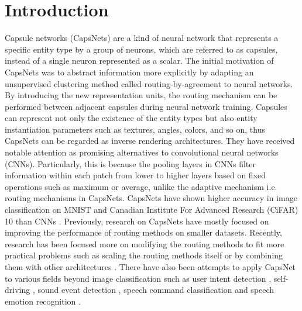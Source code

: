 \documentclass[review]{elsarticle}
\begin{document}
\linenumbers

\section{Introduction}
Capsule networks (CapsNets) \citep{DBLP:conf/icann/HintonKW11, DBLP:conf/nips/SabourFH17, DBLP:conf/iclr/HintonSF18} are a kind of neural network that represents a specific entity type by a group of neurons, which are referred to as capsules, instead of a single neuron represented as a scalar.
The initial motivation of CapsNets was to abstract information more explicitly by adapting an unsupervised clustering method called routing-by-agreement to neural networks.
By introducing the new representation units, the routing mechanism can be performed between adjacent capsules during neural network training.
Capsules can represent not only the existence of the entity types but also entity instantiation parameters such as textures, angles, colors, and so on, thus CapsNets can be regarded as inverse rendering architectures.
They have received notable attention as promising alternatives to convolutional neural networks (CNNs).
Particularly, this is because the pooling layers in CNNs filter information within each patch from lower to higher layers based on fixed operations such as maximum or average, unlike the adaptive mechanism i.e. routing mechanisms in CapsNets.
CapsNets have shown higher accuracy in image classification on MNIST \citep{lecun-mnisthandwrittendigit-2010} and Canadian Institute For Advanced Research (CiFAR) 10 \citep{Krizhevsky09learningmultiple} than CNNs \citep{DBLP:conf/nips/HahnPK19, Malmgren1314210}.
Previously, research on CapsNets have mostly focused on improving the performance of routing methods \citep{Malmgren1314210, DBLP:conf/iclr/Wang018} on smaller datasets.
Recently, research has been focused more on modifying the routing methods to fit more practical problems such as scaling the routing methods itself \citep{DBLP:conf/iclr/TsaiSGS20} or by combining them with other architectures \citep{DBLP:conf/icann/HePLHZ19, 8852016, wang-2019-towards}.
There have also been attempts to apply CapsNet to various fields beyond image classification such as user intent detection \citep{DBLP:conf/emnlp/XiaZYCY18, DBLP:conf/acl/ZhangLDFY19}, self-driving \citep{DBLP:journals/tjs/KimC19},
sound event detection \citep{DBLP:conf/eusipco/Iqbal0KW18}, speech command classification \citep{DBLP:conf/interspeech/BaeK18} and speech emotion recognition \citep{DBLP:conf/icassp/WuLCLYDMHWLM19}.
\end{document}
